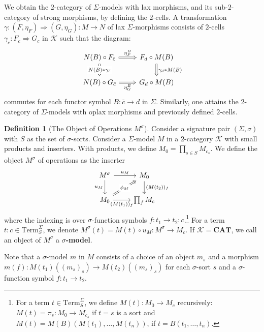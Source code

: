 \documentclass[11pt]{article}
\theoremstyle{plain}
\theoremstyle{definition}
\newtheorem{definition}[theorem]{Definition}
\numberwithin{equation}{section}
\newcommand{\K}{\mathcal{K}}
\newcommand{\Term}{\mathrm{Term}}
\newcommand{\CAT}{\mathbf{CAT}}
\begin{document}
We obtain the $2$-category of $\Sigma$-models with lax morphisms, and its sub-$2$-category of strong morphisms, by defining the $2$-cells. A transformation $\gamma \colon (F,\eta_F) \Rightarrow (G, \eta_G) \colon M \to N$ of lax $\Sigma$-morphisms consists of $2$-cells $\gamma_c \colon F_c \Rightarrow G_c$ in $\K$ such that the diagram:
$$
\begin{tikzcd}[ampersand replacement=\&]
N(B) \circ F_{\bar{c}} \arrow[d, "N(B)*\gamma_{\bar{c}}" description, Rightarrow] \arrow[r, "\eta^B_F", Rightarrow] \& F_d \circ M(B) \arrow[d, "\gamma_d*M(B)", Rightarrow] \\
N(B) \circ G_{\bar{c}} \arrow[r, "\eta_G^B"', Rightarrow]                                                           \& G_d \circ M(B)
\end{tikzcd}
$$
commutes for each functor symbol $B\colon \bar{c}\to d$ in $\Sigma$. Similarly, one attains the $2$-category of $\Sigma$-models with oplax morphisms and previously defined $2$-cells.

\begin{definition}[The Object of Operations $M^\sigma$]
   Consider a signature pair $(\Sigma,\sigma)$ with $S$ as the set of $\sigma$-sorts. Consider a $\Sigma$-model $M$ in a $2$-category $\K$ with small products and inserters. With products, we define $M_0 = \prod_{s \in S} M_{c_s}$. We define the object $M^\sigma$ of operations as the inserter
   $$
   \begin{tikzcd}
M^\sigma \arrow[d, "u_M"'] \arrow[r, "u_M"]                                    & M_0 \arrow[d, "(M(t_2))_f"]            \\
M_0 \arrow[r, "(M(t_1))_f"'] \arrow[ru, "\phi_M" description, Rightarrow] & \prod_{f} M_c
\end{tikzcd}
   $$
   where the indexing is over $\sigma$-function symbols $f\colon t_1\to t_2\colon c$.\footnote{For a term $t\in\Term_S^\Sigma$, we define $M(t)\colon M_0\to M_c$ recursively: $M(t) = \pi_s\colon M_0\to M_{c_s}$ if $t = s$ is a sort and $M(t) = M(B)(M(t_1),\ldots, M(t_n))$, if $t = B(t_1,\ldots, t_n)$.} For a term $t\colon c\in \Term_S^\Sigma$, we denote $M^\sigma(t) = M(t)\circ u_M\colon M^\sigma\to M_c$. If $\K = \CAT$, we call an object of $M^\sigma$ a \textbf{$\sigma$-model}.
\end{definition}
Note that a $\sigma$-model $m$ in $M$ consists of a choice of an object $m_s$ and a morphism $m(f)\colon M(t_1)((m_s)_s)\to M(t_2)((m_s)_s)$ for each $\sigma$-sort $s$ and a $\sigma$-function symbol $f\colon t_1\to t_2$. 
\end{document}
